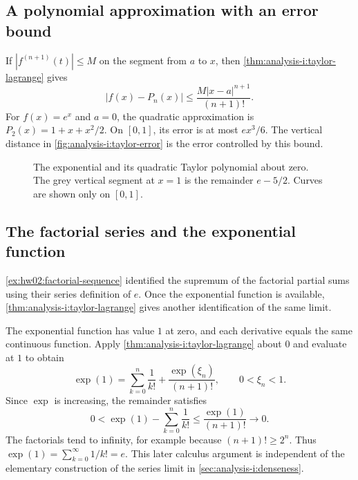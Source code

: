 \subsection{A polynomial approximation with an error bound}
If $|f^{(n+1)}(t)|\le M$ on the segment from $a$ to $x$, then
\autoref{thm:analysis-i:taylor-lagrange} gives
\[
  |f(x)-P_n(x)|\le\frac{M|x-a|^{n+1}}{(n+1)!}.
\]
For $f(x)=e^x$ and $a=0$, the quadratic approximation is
$P_2(x)=1+x+x^2/2$. On $[0,1]$, its error is at most $ex^3/6$.
The vertical distance in \autoref{fig:analysis-i:taylor-error} is the
error controlled by this bound.

\begin{figure}[htbp]
  \centering
  
  \caption[Taylor error as a vertical distance.]{
    The exponential and its quadratic Taylor polynomial about zero.
    The grey vertical segment at $x=1$ is the remainder $e-5/2$.
    Curves are shown only on $[0,1]$.}
  \label{fig:analysis-i:taylor-error}
\end{figure}

\subsection{The factorial series and the exponential function}
\autoref{ex:hw02:factorial-sequence} identified the supremum of the
factorial partial sums using their series definition of $e$.
Once the exponential function is available, \autoref{thm:analysis-i:taylor-lagrange} gives
another identification of the same limit.

The exponential function has value $1$ at zero, and each derivative
equals the same continuous function. Apply \autoref{thm:analysis-i:taylor-lagrange} about $0$
and evaluate at $1$ to obtain
\[
  \exp(1)=\sum_{k=0}^{n}\frac1{k!}
    +\frac{\exp(\xi_n)}{(n+1)!},\qquad 0<\xi_n<1.
\]
Since $\exp$ is increasing, the remainder satisfies
\[
  0<\exp(1)-\sum_{k=0}^{n}\frac1{k!}
    \leq\frac{\exp(1)}{(n+1)!}\longrightarrow0.
\]
The factorials tend to infinity, for example because $(n+1)!\geq2^n$.
Thus $\exp(1)=\sum_{k=0}^{\infty}1/k!=e$. This later calculus argument
is independent of the elementary construction of the series limit in
\autoref{sec:analysis-i:denseness}.
